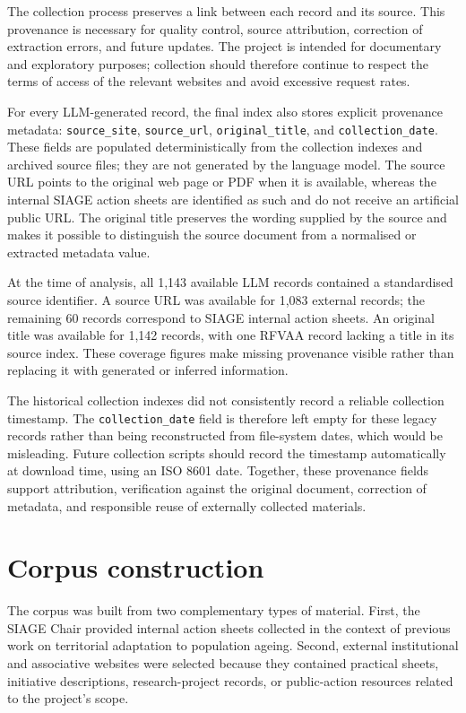 \documentclass[
11pt,
english,
singlespacing,
headsepline,
]{MastersDoctoralThesis}
\begin{document}
The collection process preserves a link between each record and its source.
This provenance is necessary for quality control, source attribution, correction
of extraction errors, and future updates. The project is intended for
documentary and exploratory purposes; collection should therefore continue to
respect the terms of access of the relevant websites and avoid excessive request
rates.

For every LLM-generated record, the final index also stores explicit provenance
metadata: \texttt{source\_site}, \texttt{source\_url},
\texttt{original\_title}, and \texttt{collection\_date}. These fields are
populated deterministically from the collection indexes and archived source
files; they are not generated by the language model. The source URL points to
the original web page or PDF when it is available, whereas the internal SIAGE
action sheets are identified as such and do not receive an artificial public
URL. The original title preserves the wording supplied by the source and makes
it possible to distinguish the source document from a normalised or extracted
metadata value.

At the time of analysis, all 1,143 available LLM records contained a
standardised source identifier. A source URL was available for 1,083 external
records; the remaining 60 records correspond to SIAGE internal action sheets.
An original title was available for 1,142 records, with one RFVAA record lacking
a title in its source index. These coverage figures make missing provenance
visible rather than replacing it with generated or inferred information.

The historical collection indexes did not consistently record a reliable
collection timestamp. The \texttt{collection\_date} field is therefore left
empty for these legacy records rather than being reconstructed from file-system
dates, which would be misleading. Future collection scripts should record the
timestamp automatically at download time, using an ISO 8601 date. Together,
these provenance fields support attribution, verification against the original
document, correction of metadata, and responsible reuse of externally collected
materials.

\section{Corpus construction}

The corpus was built from two complementary types of material. First, the SIAGE
Chair provided internal action sheets collected in the context of previous work
on territorial adaptation to population ageing. Second, external institutional
and associative websites were selected because they contained practical sheets,
initiative descriptions, research-project records, or public-action resources
related to the project's scope.
\end{document}
